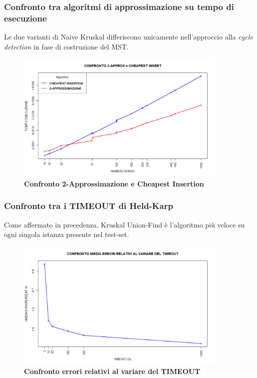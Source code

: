 \documentclass[]{article}
\begin{document}
\begin{flushleft}
\subsubsection{Confronto tra algoritmi di approssimazione su tempo di esecuzione}
Le due varianti di Naive Kruskal differiscono unicamente nell'approccio alla \textit{cycle detection} in fase di costruzione del MST.\\
\begin{figure}[h]
	\centering
	\includegraphics[width=0.9\textwidth,height=\textheight,keepaspectratio]{TEMPO_SU_NODI_2_CHEAP_NEW.png}
	\caption{\textbf{Confronto 2-Approssimazione e Cheapest Insertion}}
	\label{app-cheap}
\end{figure}

\newpage
\subsubsection{Confronto tra i TIMEOUT di Held-Karp}
Come affermato in precedenza, Kruskal Union-Find è l'algoritmo più veloce su ogni singola istanza presente nel test-set.

\begin{figure}[h]
\centering
\includegraphics[width=0.9\textwidth, height=\textheight,keepaspectratio]{CONFRONTO_TIMEOUT_ERRORI.png}
\caption{\textbf{Confronto errori relativi al variare del TIMEOUT}}
\label{TIMEOUT-err}
\end{figure}


\end{flushleft}
\end{document}
